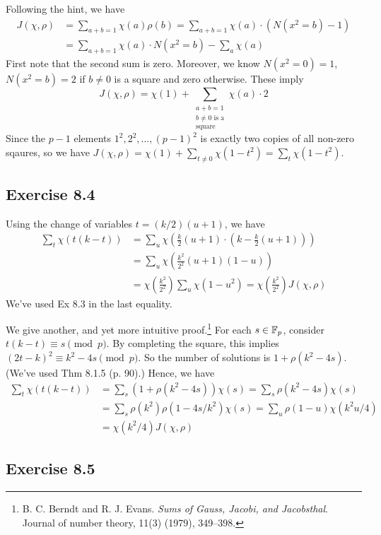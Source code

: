 \documentclass[../I&R.tex]{subfiles}
\begin{document}
Following the hint, we have
\begin{align*}
J(\chi,\rho) &= \sum_{a+b=1} \chi(a)\rho(b)=\sum_{a+b=1} \chi(a)\cdot\left(N(x^2=b)-1\right) \\
&= \sum_{a+b=1} \chi(a)\cdot N(x^2=b)-\sum_a \chi(a)
\end{align*}
First note that the second sum is zero. Moreover, we know $N(x^2=0)=1$, $N(x^2=b)=2$ if $b\neq0$ is a square and zero otherwise. These imply $$J(\chi,\rho) = \chi(1) + \sum_{\substack{a+b=1\\ b\neq0 \text{ is a} \\ \text{square}}} \chi(a)\cdot 2$$
Since the $p-1$ elements $1^2,2^2,\ldots,(p-1)^2$ is exactly two copies of all non-zero sqaures, so we have $J(\chi,\rho) = \chi(1) + \sum_{t\neq0} \chi(1-t^2) = \sum_t \chi(1-t^2)$.

\subsection*{Exercise 8.4}

Using the change of variables $t=(k/2)(u+1)$, we have
\begin{align*}
\sum_t \chi(t(k-t)) &= \sum_u \chi\left(\frac{k}{2}(u+1)\cdot\left(k-\frac{k}{2}(u+1)\right)\right) \\
&= \sum_u \chi\left(\frac{k^2}{2^2}(u+1)(1-u)\right) \\ 
&= \chi\left(\frac{k^2}{2^2}\right)\sum_u \chi(1-u^2) = \chi\left(\frac{k^2}{2^2}\right) J(\chi,\rho)
\end{align*}
We've used Ex 8.3 in the last equality.

We give another, and yet more intuitive proof.\footnote{B. C. Berndt and R. J. Evans. \textit{Sums of Gauss, Jacobi, and Jacobsthal}. Journal of number theory, 11(3) (1979), 349–398.} For each $s\in\mathbb{F}_p$, consider $t(k-t)\equiv s\pmod{p}$. By completing the square, this implies $(2t-k)^2\equiv k^2-4s\pmod{p}$. So the number of solutions is $1+\rho(k^2-4s)$. (We've used Thm 8.1.5 (p. 90).) Hence, we have
\begin{align*}
\sum_t \chi(t(k-t)) &= \sum_s \left(1+\rho(k^2-4s)\right)\chi(s) = \sum_s \rho(k^2-4s)\chi(s) \\
&= \sum_s \rho(k^2)\rho(1-4s/k^2)\chi(s) = \sum_u \rho(1-u)\chi(k^2u/4) \\
&= \chi(k^2/4)J(\chi,\rho)
\end{align*} 

\subsection*{Exercise 8.5}
\end{document}
